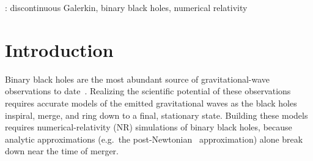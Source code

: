 \documentclass[12pt]{caltech_thesis}
\newcommand{\Fullerton}{Nicholas and Lee Begovich Center for Gravitational-Wave
  Physics and Astronomy, California State University Fullerton, Fullerton, CA
  92834, USA} \newcommand{\FullertonId}{1}
\newcommand{\Caltech}{Theoretical Astrophysics 350-17, California Institute of
  Technology, Pasadena, CA 91125, USA} \newcommand{\CaltechId}{2}
\newcommand{\CornellPhysics}{Department of Physics, Cornell University, Ithaca,
  New York 14853, USA} \newcommand{\CornellPhysicsId}{3}
\newcommand{\CornellLepp}{Laboratory for Elementary Particle Physics, Cornell
  University, Ithaca, New York 14853, USA} \newcommand{\CornellLeppId}{4}
\newcommand{\CornellCcaps}{Cornell Center for Astrophysics and Planetary
  Science, Cornell University, Ithaca, New York 14853, USA}
\newcommand{\CornellCcapsId}{5}
\newcommand{\Northwestern}{Center for Interdisciplinary Exploration and
Research in Astrophysics, Northwestern University, Evanston, IL 60201, USA}
\newcommand{\NorthwesternId}{6}
\newcommand{\Icts}{International Centre for Theoretical Sciences, Tata Institute
  of Fundamental Research, Bangalore 560089, India} \newcommand{\IctsId}{7}
\newcommand{\Aei}{Max Planck Institute for Gravitational Physics (Albert
  Einstein Institute), D-14467 Potsdam, Germany} \newcommand{\AeiId}{{8}}
\newcommand{\UCLA}{Mani L.~Bhaumik Institute for Theoretical Physics, Department
of Physics and Astronomy, UCLA, Los Angeles, CA 90095} \newcommand{\UCLAId}{9}
\newcommand{\Oberlin}{Department of Physics and Astronomy, Oberlin College,
  Oberlin, Ohio 44074, USA} \newcommand{\OberlinId}{{10}}
\newcommand{\WSU}{Department of Physics \& Astronomy, Washington State University, Pullman, WA 99164, USA}
\newcommand{\WSUId}{{11}}
\begin{document}
\begin{bibunit}[unsrtnat]
\address{$^\FullertonId$\Fullerton}
\address{$^\CaltechId$\Caltech}
\address{$^\CornellPhysicsId$\CornellPhysics}
\address{$^\CornellLeppId$\CornellLepp}
\address{$^\CornellCcapsId$\CornellCcaps}
\address{$^\NorthwesternId$\Northwestern}
\address{$^\IctsId$\Icts}
\address{$^\AeiId$\Aei}
\address{$^\UCLAId$\UCLA}
\address{$^\OberlinId$\Oberlin}
\address{$^\WSUId$\WSU}
\address{$^{\star}$The first two authors contributed equally.}

\begin{abstract}

  Binary black holes are the most abundant source of gravitational-wave
  observations. Gravitational-wave observatories in the next decade will require
  tremendous increases in the accuracy of numerical waveforms modeling binary
  black holes, compared to today's state of the art. One approach to achieving
  the required accuracy is using spectral-type methods that scale to many
  processors. Using the
  \texttt{SpECTRE} numerical-relativity code, we present the first simulations
  of a binary black hole inspiral, merger, and ringdown using discontinuous
  Galerkin methods. The efficiency of discontinuous Galerkin methods allows us
  to evolve the binary through $\sim18$ orbits at reasonable computational cost.
  We then use \texttt{SpECTRE}'s Cauchy Characteristic Evolution (CCE) code to
  extract the gravitational waves at future null infinity.  The open-source
  nature of \texttt{SpECTRE} means this is the first time a spectral-type method
  for simulating binary black hole evolutions is available to the entire
  numerical-relativity community.

\end{abstract}

: discontinuous Galerkin, binary black holes, numerical
relativity


\section{Introduction\label{sec:introduction}}

Binary black holes are the most abundant source of gravitational-wave
observations to date~\cite{KAGRA:2021vkt}. Realizing the scientific potential of
these observations requires accurate models of the emitted gravitational waves
as the black holes inspiral, merge, and ring down to a final, stationary
state. Building these models requires numerical-relativity (NR) simulations of binary
black holes, because analytic approximations (e.g.~the
post-Newtonian~\cite{Blanchet:2024mnz} approximation) alone break down near the
time of merger.


\end{bibunit}
\end{document}
